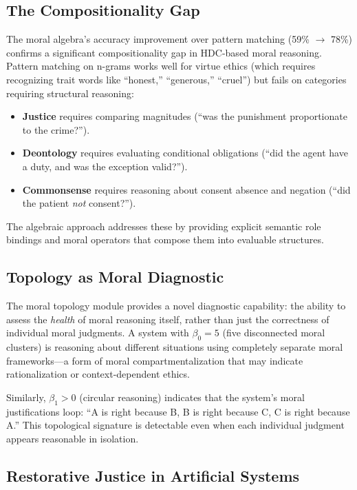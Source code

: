 \documentclass[11pt,a4paper]{article}
\begin{document}
\subsection{The Compositionality Gap}

The moral algebra's accuracy improvement over pattern matching (59\% $\to$ 78\%) confirms a significant compositionality gap in HDC-based moral reasoning. Pattern matching on n-grams works well for virtue ethics (which requires recognizing trait words like ``honest,'' ``generous,'' ``cruel'') but fails on categories requiring structural reasoning:

\begin{itemize}
  \item \textbf{Justice} requires comparing magnitudes (``was the punishment proportionate to the crime?'').
  \item \textbf{Deontology} requires evaluating conditional obligations (``did the agent have a duty, and was the exception valid?'').
  \item \textbf{Commonsense} requires reasoning about consent absence and negation (``did the patient \emph{not} consent?'').
\end{itemize}

The algebraic approach addresses these by providing explicit semantic role bindings and moral operators that compose them into evaluable structures.

\subsection{Topology as Moral Diagnostic}

The moral topology module provides a novel diagnostic capability: the ability to assess the \emph{health} of moral reasoning itself, rather than just the correctness of individual moral judgments. A system with $\beta_0 = 5$ (five disconnected moral clusters) is reasoning about different situations using completely separate moral frameworks---a form of moral compartmentalization that may indicate rationalization or context-dependent ethics.

Similarly, $\beta_1 > 0$ (circular reasoning) indicates that the system's moral justifications loop: ``A is right because B, B is right because C, C is right because A.'' This topological signature is detectable even when each individual judgment appears reasonable in isolation.

\subsection{Restorative Justice in Artificial Systems}
\end{document}
